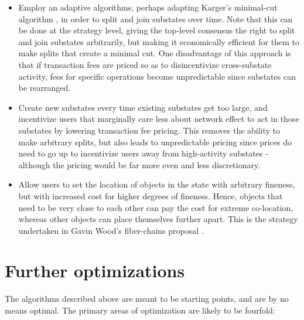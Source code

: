 \documentclass[11pt,a4paper]{report}
\theoremstyle{plain}
\theoremstyle{definition}
\theoremstyle{remark}
\begin{document}
\begin{itemize}
\item
Employ an adaptive algorithms, perhaps adapting Karger's minimal-cut algorithm \citep{karger_global_1993, stoer_simple_1997}, in order to split and join substates over time. Note that this can be done at the strategy level, giving the top-level consensus the right to split and join substates arbitrarily, but making it economically efficient for them to make splits that create a minimal cut. One disadvantage of this approach is that if transaction fees are priced so as to disincentivize cross-substate activity, fees for specific operations become unpredictable since substates can be rearranged.
\item
Create new substates every time existing substates get too large, and incentivize users that marginally care less about network effect to act in those substates by lowering transaction fee pricing. This removes the ability to make arbitrary splits, but also leads to unpredictable pricing since prices do need to go up to incentivize users away from high-activity substates - although the pricing would be far more even and less discretionary.
\item
Allow users to set the location of objects in the state with arbitrary fineness, but with increased cost for higher degrees of fineness. Hence, objects that need to be very close to each other can pay the cost for extreme co-location, whereas other objects can place themselves further apart. This is the strategy undertaken in Gavin Wood's fiber-chains proposal \citep{wood_blockchain_2015}.
\end{itemize}

\chapter{Further optimizations}

The algorithms described above are meant to be starting points, and are by no means optimal. The primary areas of optimization are likely to be fourfold:
\end{document}
